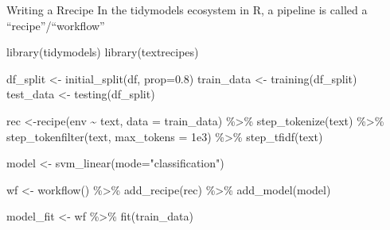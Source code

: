 \documentclass[
  10pt,
  ignorenonframetext,
  aspectratio=169]{beamer}
\newenvironment{Shaded}{\begin{snugshade}}{\end{snugshade}}
\newcommand{\AttributeTok}[1]{\textcolor[rgb]{0.80,0.80,0.80}{#1}}
\newcommand{\FloatTok}[1]{\textcolor[rgb]{0.75,0.75,0.82}{#1}}
\newcommand{\FunctionTok}[1]{\textcolor[rgb]{0.94,0.94,0.56}{#1}}
\newcommand{\NormalTok}[1]{\textcolor[rgb]{0.80,0.80,0.80}{#1}}
\newcommand{\OtherTok}[1]{\textcolor[rgb]{0.94,0.94,0.56}{#1}}
\newcommand{\SpecialCharTok}[1]{\textcolor[rgb]{0.86,0.64,0.64}{#1}}
\newcommand{\StringTok}[1]{\textcolor[rgb]{0.80,0.58,0.58}{#1}}
\begin{document}
\begin{frame}[fragile]{Writing a Rrecipe}
\protect\hypertarget{writing-a-rrecipe}{}
In the tidymodels ecosystem in R, a pipeline is called a
``recipe''/``workflow''

\medskip
\scriptsize

\begin{Shaded}
\begin{Highlighting}[]
\FunctionTok{library}\NormalTok{(tidymodels)}
\FunctionTok{library}\NormalTok{(textrecipes)}

\NormalTok{df\_split }\OtherTok{\textless{}{-}} \FunctionTok{initial\_split}\NormalTok{(df, }\AttributeTok{prop=}\FloatTok{0.8}\NormalTok{)}
\NormalTok{train\_data }\OtherTok{\textless{}{-}} \FunctionTok{training}\NormalTok{(df\_split)}
\NormalTok{test\_data }\OtherTok{\textless{}{-}} \FunctionTok{testing}\NormalTok{(df\_split)}

\NormalTok{rec }\OtherTok{\textless{}{-}}\FunctionTok{recipe}\NormalTok{(env }\SpecialCharTok{\textasciitilde{}}\NormalTok{ text, }\AttributeTok{data =}\NormalTok{ train\_data) }\SpecialCharTok{\%\textgreater{}\%}
  \FunctionTok{step\_tokenize}\NormalTok{(text) }\SpecialCharTok{\%\textgreater{}\%}
  \FunctionTok{step\_tokenfilter}\NormalTok{(text, }\AttributeTok{max\_tokens =} \FloatTok{1e3}\NormalTok{) }\SpecialCharTok{\%\textgreater{}\%}
  \FunctionTok{step\_tfidf}\NormalTok{(text)}

\NormalTok{model }\OtherTok{\textless{}{-}} \FunctionTok{svm\_linear}\NormalTok{(}\AttributeTok{mode=}\StringTok{"classification"}\NormalTok{)}

\NormalTok{wf }\OtherTok{\textless{}{-}} \FunctionTok{workflow}\NormalTok{() }\SpecialCharTok{\%\textgreater{}\%}
  \FunctionTok{add\_recipe}\NormalTok{(rec) }\SpecialCharTok{\%\textgreater{}\%}
  \FunctionTok{add\_model}\NormalTok{(model)}

\NormalTok{model\_fit }\OtherTok{\textless{}{-}}\NormalTok{ wf }\SpecialCharTok{\%\textgreater{}\%} 
  \FunctionTok{fit}\NormalTok{(train\_data)}
\end{Highlighting}
\end{Shaded}
\end{frame}
\end{document}
